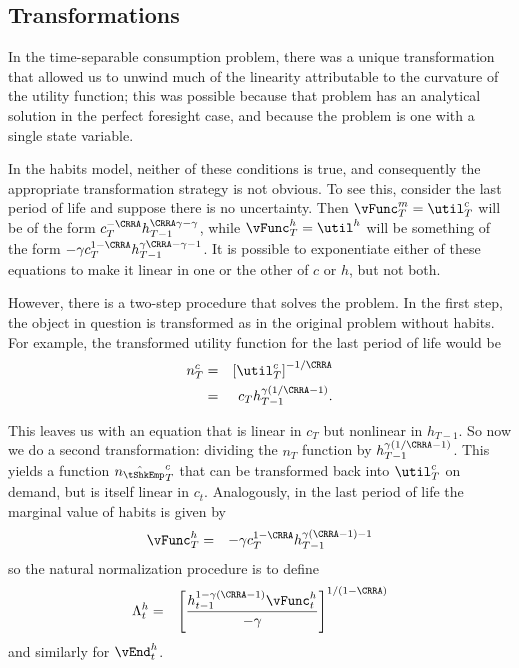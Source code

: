\documentclass[titlepage]{\econtex}
\begin{document}
{\hypertarget{Transforamtions}{}
\subsection{Transformations}

In the time-separable consumption problem, there was a unique
transformation that allowed us to unwind much of the linearity
attributable to the curvature of the utility function; this was
possible because that problem has an analytical solution in the
perfect foresight case, and because the problem is one with a single
state variable.

In the habits model, neither of these conditions is true, and
consequently the appropriate transformation strategy is not obvious.
To see this, consider the last period of life and suppose there is no
uncertainty.  Then ${\vFunc}_{T}^{m} = \util_{T}^{c}$ will be of the form
${c}_{T}^{-\CRRA}h_{T-1}^{\CRRA \gamma - \gamma}$, while ${\vFunc}_{T}^{h} =
\util^{h}$ will be something of the form $-\gamma
{c}_{T}^{1-\CRRA}h_{T-1}^{\gamma\CRRA-\gamma-1}$.  It is possible to
exponentiate either of these equations to make it linear in one or the
other of ${c}$ or $h$, but not both.

However, there is a two-step procedure that solves the problem.  In
the first step, the object in question is transformed as in the
original problem without habits.  For example, the transformed utility
function for the last period of life would be
\begin{eqnarray}
        n_{T}^{c} & = & \left[\util^{c}_{T}\right]^{-1/\CRRA}
\\       & = & {c}_{T}h_{T-1}^{\gamma(1/\CRRA-1)}.
\end{eqnarray}

This leaves us with an equation that is linear in ${c}_{T}$ but
nonlinear in $h_{T-1}$.  So now we do a second transformation:
dividing the $n_{T}$ function by $h_{T-1}^{\gamma(1/\CRRA-1)}$.  This
yields a function $\hat{n_{\tShkEmp}}_{T}^{c}$ that can be transformed back into
$\util^{c}_{T}$ on demand, but is itself linear in ${c}_{t}.$  Analogously,
in the last period of life the marginal value of habits is given by
\begin{eqnarray*}
        {\vFunc}_{T}^{h} & = & -\gamma {c}_{T}^{1-\CRRA}h_{T-1}^{\gamma(\CRRA-1)-1}
\end{eqnarray*}
so the natural normalization procedure is to define
\begin{eqnarray}
        \Lambda_{t}^{h} & = &
        \left[\frac{h_{t-1}^{1-\gamma(\CRRA-1)}{\vFunc}_{t}^{h}}{-\gamma}\right]^{1/(1-\CRRA)}
\end{eqnarray}
and similarly for $\vEnd_{t}^{h}$.


}
\end{document}
